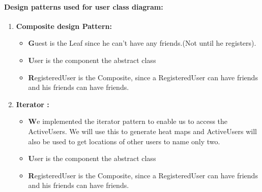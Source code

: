 \documentclass[11pt]{article}
\begin{document}
	    \paragraph{Design patterns used for user class diagram: }
		\begin{enumerate}
			\item \textbf{Composite design Pattern:}
			\begin{itemize}
				\item \textbf Guest is the Leaf since he can't have any friends.(Not until he registers).
				\item \textbf User is the component the abstract class
				\item \textbf RegisteredUser is the Composite, since a RegisteredUser can have friends and his friends can have friends.
			\end{itemize}
		
			\item \textbf{Iterator :}
			\begin{itemize}
				\item \textbf We implemented the iterator pattern to enable us to access the ActiveUsers. We will use this to generate heat maps and  ActiveUsers will also be used to get locations of other users 
							to name only two.
				\item \textbf User is the component the abstract class
				\item \textbf RegisteredUser is the Composite, since a RegisteredUser can have friends and his friends can have friends.
			\end{itemize}		
		
		\end{enumerate}
	
\end{document}
